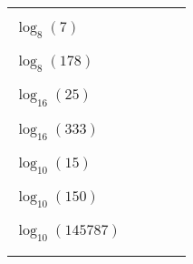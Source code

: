 \documentclass[10pt]{article}
\begin{document}
\begin{enumerate}
\begin{center}
\begin{tabular}{lcccc}
 & & & & \\ & & & & \\
 $\log_8(7)$ & \underline{\hspace{1in}} & \underline{\hspace{1in}} & \underline{\hspace{1in}}  & \underline{\hspace{1in}} \\
 & & & & \\ & & & & \\
$\log_8(178)$ & \underline{\hspace{1in}} & \underline{\hspace{1in}} & \underline{\hspace{1in}}  & \underline{\hspace{1in}} \\
 & & & & \\ & & & & \\
$\log_{16}(25)$ & \underline{\hspace{1in}} & \underline{\hspace{1in}} & \underline{\hspace{1in}}  & \underline{\hspace{1in}} \\
 & & & & \\ & & & & \\
$\log_{16}(333)$ & \underline{\hspace{1in}} & \underline{\hspace{1in}} & \underline{\hspace{1in}}  & \underline{\hspace{1in}} \\
 & & & & \\ & & & & \\
$\log_{10}(15)$ & \underline{\hspace{1in}} & \underline{\hspace{1in}} & \underline{\hspace{1in}}  & \underline{\hspace{1in}} \\
 & & & & \\ & & & & \\
$\log_{10}(150)$ & \underline{\hspace{1in}} & \underline{\hspace{1in}} & \underline{\hspace{1in}}  & \underline{\hspace{1in}} \\
 & & & & \\ & & & & \\
$\log_{10}(145787)$ & \underline{\hspace{1in}} & \underline{\hspace{1in}} & \underline{\hspace{1in}}  & \underline{\hspace{1in}} \\
 & & & & \\ & & & & \\
\end{tabular}
\end{center}


\end{enumerate}
\end{document}
